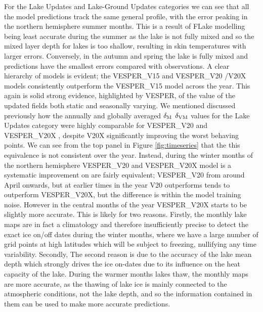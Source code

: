 \documentclass[hess, twostagejnl]{copernicus}
\providecommand{\DIFadd}[1]{{\protect\color{blue} \sf #1}} %
\providecommand{\DIFdel}[1]{{\protect\color{red} \scriptsize #1}} %
\providecommand{\DIFaddbegin}{} %
\providecommand{\DIFaddend}{} %
\providecommand{\DIFdelbegin}{} %
\providecommand{\DIFdelend}{} %
\begin{document}
\noindent For the Lake Updates and Lake-Ground Updates categories we can see that all the model predictions track the same general profile, with the error peaking in the northern hemisphere summer months. This is a result of FLake modelling being least accurate during the summer as the lake is not fully mixed and so the mixed layer depth for lakes is too shallow, resulting in skin temperatures with larger errors. Conversely, in the autumn and spring the lake is fully mixed and predictions have the smallest errors compared with observations. A clear hierarchy of models is evident; the \DIFaddbegin \DIFadd{VESPER\_V15 and VESPER\_}\DIFaddend V20 \DIFdelbegin \DIFdel{/V20X }\DIFdelend models consistently outperform \DIFdelbegin \DIFdel{the }\DIFdelend \DIFaddbegin \DIFadd{VESPER\_}\DIFaddend V15 \DIFdelbegin \DIFdel{model }\DIFdelend across the year. This again is \DIFdelbegin \DIFdel{solid }\DIFdelend \DIFaddbegin \DIFadd{strong }\DIFaddend evidence, highlighted by VESPER, of the value of the updated fields both static and seasonally varying. We \DIFdelbegin \DIFdel{mentioned }\DIFdelend \DIFaddbegin \DIFadd{discussed }\DIFaddend previously how the annually and globally averaged \DIFdelbegin \DIFdel{$\delta_{\rm M}$ }\DIFdelend \DIFaddbegin \DIFadd{$\delta_{\rm VM}$ }\DIFaddend values for the Lake Updates category were highly comparable for \DIFaddbegin \DIFadd{VESPER\_}\DIFaddend V20 and \DIFaddbegin \DIFadd{VESPER\_}\DIFaddend V20X\DIFdelbegin \DIFdel{, despite V20X significantly improving the worst behaving points}\DIFdelend . We can see from the top panel in Figure \ref{fig:timeseries} that \DIFdelbegin \DIFdel{the }\DIFdelend \DIFaddbegin \DIFadd{this equivalence is not consistent over the year. Instead, during the winter months of the northern hemisphere  VESPER\_V20 and VESPER\_}\DIFaddend V20X \DIFdelbegin \DIFdel{model is a systematic improvement on }\DIFdelend \DIFaddbegin \DIFadd{are fairly equivalent;  VESPER\_}\DIFaddend V20 \DIFdelbegin \DIFdel{from around April onwards, but at earlier times in the year V20 outperforms }\DIFdelend \DIFaddbegin \DIFadd{tends to outperform VESPER\_V20X, but the difference is within the model training noise. However in the central months of the year VESPER\_}\DIFaddend V20X \DIFaddbegin \DIFadd{starts to be slightly more accurate}\DIFaddend . This is likely for two reasons. Firstly, the monthly lake maps are in fact a climatology and therefore insufficiently precise to detect the exact ice on/off dates during the winter months, where we have a large number of grid points at high latitudes which will be subject to freezing, nullifying any time variability. \DIFdelbegin \DIFdel{Secondly, }\DIFdelend \DIFaddbegin \DIFadd{The second reason is }\DIFaddend due to the accuracy of the lake mean depth which strongly drives the ice on-dates due to its influence on the heat capacity of the lake. During the warmer months lakes thaw, the monthly maps are more accurate, as the thawing of lake ice is mainly connected to the atmospheric conditions, not the lake depth, and so the information contained in them can be used to make more accurate predictions. \DIFaddbegin \newline 
\end{document}
